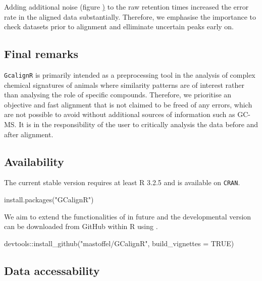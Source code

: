 Adding additional noise (figure \href{figure:noise}) to the raw
retention times increased the error rate in the aligned data
substantially. Therefore, we emphasise the importance to check datasets
prior to alignment and elliminate uncertain peaks early on.

\subsection{Final remarks}\label{final-remarks}

\texttt{GcalignR} is primarily intended as a preprocessing tool in the
analysis of complex chemical signatures of animals where similarity
patterns are of interest rather than analysing the role of specific
compounds. Therefore, we prioritise an objective and fast alignment that
is not claimed to be freed of any errors, which are not possible to
avoid without additional sources of information such as GC-MS. It is in
the responsibility of the user to critically analysis the data before
and after alignment.

\subsection{Availability}\label{availability}

The current stable version requires at least R 3.2.5 and is available on
\texttt{CRAN}.

\begin{Schunk}
\begin{Sinput}
install.packages("GCalignR")
\end{Sinput}
\end{Schunk}

We aim to extend the functionalities of  in future and the
developmental version can be downloaded from GitHub within R using
\href{https://cran.r-project.org/web/packages/devtools/index.html}{}
\citep{Wickham.2016}.

\begin{Schunk}
\begin{Sinput}
devtools::install_github("mastoffel/GCalignR", build_vignettes = TRUE)
\end{Sinput}
\end{Schunk}

\subsection{Data accessability}\label{data-accessability}

